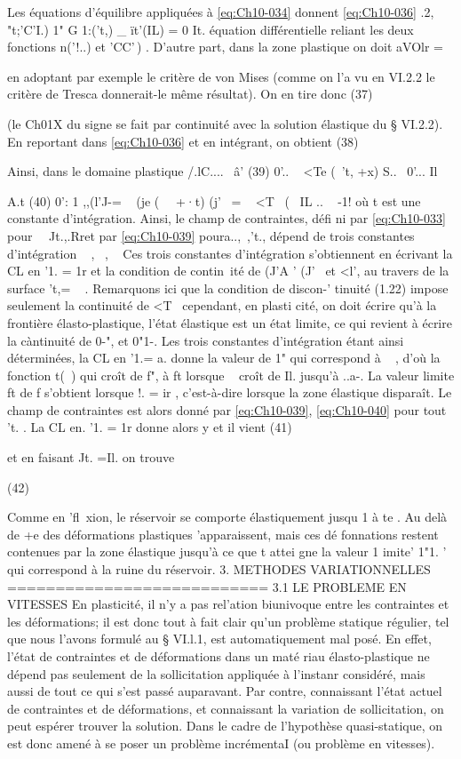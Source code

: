 {{{Les équations d'équilibre appliquées à \eqref{eq:Ch10-034} donnent 
\eqref{eq:Ch10-036} 	.2, "t;'C'I.) 1" G 1:('t,) _ ït'(IL) = 0 It. 
équation différentielle reliant les deux fonctions n('!..) et 'CC'\,) . 
D'autre part, dans la zone plastique on doit aVOlr 
= 



en adoptant par exemple le critère de von Mises (comme on l'a vu en VI.2.2 le critère de Tresca donnerait-le même résultat). On en tire donc 
(37) 

(le Ch01X du signe se fait par continuité avec la solution élastique du § VI.2.2). En reportant dans \eqref{eq:Ch10-036} et en intégrant, on obtient 
(38) 

Ainsi, dans le domaine plastique 
/.lC.... ~â'
(39) 0'.. 
~ <Te (~'t, +x) S..~ 0'... Il}
A.t 
(40) 0': 1 ,,(l'J-= ~ (je (~~ +·t) (j'~ = ~ <T~ ( ~IL .. ~ -1! 
où t est une constante d'intégration. Ainsi, le champ de contraintes, défi­
ni par \eqref{eq:Ch10-033} pour ~~Jt.,.Rret par \eqref{eq:Ch10-039} poura..,~,'t., dépend de trois constantes d'intégration ~ ,~ , ~ Ces trois constantes d'intégration s'obtiennent en écrivant la CL en '1. = 1r et la condition de contin~ité de (J'A ' (J'~ et <l', au travers de la surface 't,= ~ . Remarquons ici que la condition de discon-' tinuité (1.22) impose seulement la continuité de <T~ cependant, en plasti­
cité, on doit écrire qu'à la frontière élasto-plastique, l'état élastique est un état limite, ce qui revient à écrire la càntinuité de 0-", et 0"1-. Les 
trois constantes d'intégration étant ainsi déterminées, la CL en '1.= a. donne la valeur de 1" qui correspond à ~ , d'où la fonction t(~) qui croît de f", à ft lorsque ~ croît de Il. jusqu'à ..a-. La valeur limite ft de f s'ob­tient lorsque !. = ir , c'est-à-dire lorsque la zone élastique disparaît. Le champ de contraintes est alors donné par \eqref{eq:Ch10-039}, \eqref{eq:Ch10-040} pour tout 't. . La CL en. '1. = 1r donne alors y et il vient 
(41) 

et en faisant Jt. =Il. on trouve 

(42) 

Comme en 'fl~xion, le réservoir se comporte élastiquement jusqu 1 à 
te . Au delà de +e des déformations plastiques 'apparaissent, mais ces dé­
fonnations restent contenues par la zone élastique jusqu'à ce que t attei­
gne la valeur 1 imite' 1"1. ' qui correspond à la ruine du réservoir. 
3. METHODES VARIATIONNELLES 
=========================== 
3.1 LE PROBLEME EN VITESSES 
En plasticité, il n'y a pas rel'ation biunivoque entre les contrain­tes et les déformations; il est donc tout à fait clair qu'un problème stati­que régulier, tel que nous l'avons formulé au § VI.l.1, est automatiquement mal posé. En effet, l'état de contraintes et de déformations dans un maté­
riau élasto-plastique ne dépend pas seulement de la sollicitation appliquée 
à l'instanr considéré, mais aussi de tout ce qui s'est passé auparavant. Par contre, connaissant l'état actuel de contraintes et de déformations, et con­naissant la variation de sollicitation, on peut espérer trouver la solution. Dans le cadre de l'hypothèse quasi-statique, on est donc amené à se poser un problème incrémentaI (ou problème en vitesses). 

}}
